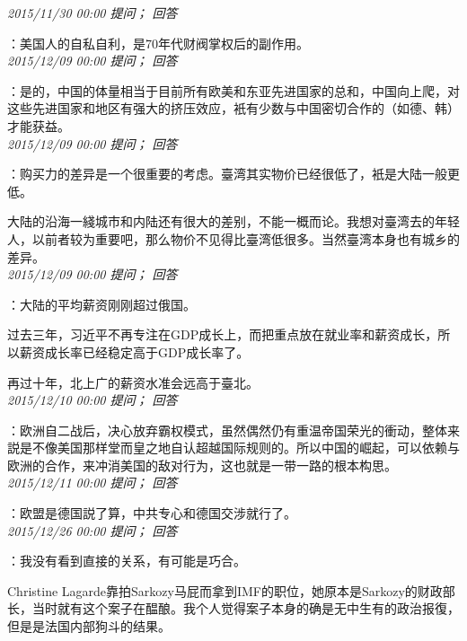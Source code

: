 \documentclass[twocolumn]{ctexart}
\begin{document}
\textit{\hfill\noindent\small 2015/11/30 00:00 提问； 回答}

：美国人的自私自利，是70年代财阀掌权后的副作用。\\

\textit{\hfill\noindent\small 2015/12/09 00:00 提问； 回答}

：是的，中国的体量相当于目前所有欧美和东亚先进国家的总和，中国向上爬，对这些先进国家和地区有强大的挤压效应，衹有少数与中国密切合作的（如德、韩）才能获益。\\

\textit{\hfill\noindent\small 2015/12/09 00:00 提问； 回答}

：购买力的差异是一个很重要的考虑。臺湾其实物价已经很低了，衹是大陆一般更低。

大陆的沿海一綫城市和内陆还有很大的差别，不能一概而论。我想对臺湾去的年轻人，以前者较为重要吧，那么物价不见得比臺湾低很多。当然臺湾本身也有城乡的差异。\\

\textit{\hfill\noindent\small 2015/12/09 00:00 提问； 回答}

：大陆的平均薪资刚刚超过俄国。

过去三年，习近平不再专注在GDP成长上，而把重点放在就业率和薪资成长，所以薪资成长率已经稳定高于GDP成长率了。

再过十年，北上广的薪资水准会远高于臺北。\\

\textit{\hfill\noindent\small 2015/12/10 00:00 提问； 回答}

：欧洲自二战后，决心放弃霸权模式，虽然偶然仍有重温帝国荣光的衝动，整体来説是不像美国那样堂而皇之地自认超越国际规则的。所以中国的崛起，可以依赖与欧洲的合作，来冲消美国的敌对行为，这也就是一带一路的根本构思。\\

\textit{\hfill\noindent\small 2015/12/11 00:00 提问； 回答}

：欧盟是德国説了算，中共专心和德国交涉就行了。\\

\textit{\hfill\noindent\small 2015/12/26 00:00 提问； 回答}

：我没有看到直接的关系，有可能是巧合。

Christine Lagarde靠拍Sarkozy马屁而拿到IMF的职位，她原本是Sarkozy的财政部长，当时就有这个案子在醖酿。我个人觉得案子本身的确是无中生有的政治报復，但是是法国内部狗斗的结果。
\end{document}
